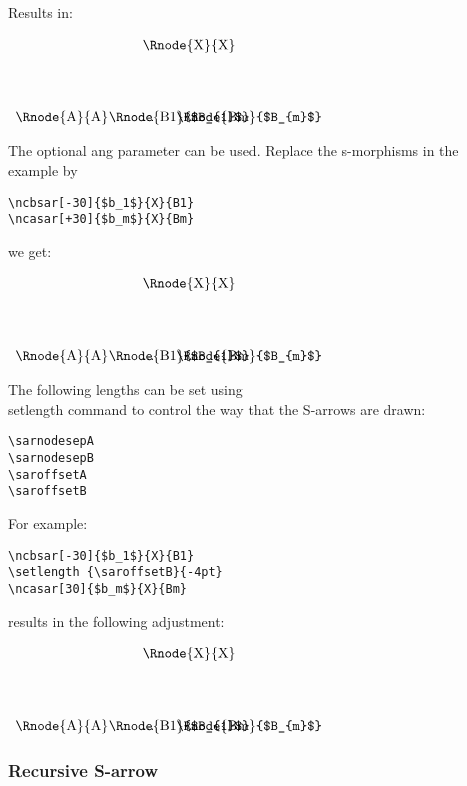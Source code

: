 \documentclass[10pt,a4paper]{article}
\begin{document}
\noindent Results in:
\begin{center}
$
\begin{array}{p{2cm}p{0.5cm}p{0.5cm}p{0.5cm}}
& & \Rnode{X}{X}& \\ [1.4cm]
\Rnode{A}{A} & \Rnode{B1}{$B_{1}$} & ... & \Rnode{Bm}{$B_{m}$}\\
\end{array}
$
\end{center}
\noindent The optional ang parameter can be used. Replace the s-morphisms in the example by
\begin{verbatim}
\ncbsar[-30]{$b_1$}{X}{B1}
\ncasar[+30]{$b_m$}{X}{Bm}
\end{verbatim}
we get:
\begin{center}
$
\begin{array}{p{2cm}p{0.5cm}p{0.5cm}p{0.5cm}}
& & \Rnode{X}{X}& \\ [1.4cm]
\Rnode{A}{A} & \Rnode{B1}{$B_{1}$} & ... & \Rnode{Bm}{$B_{m}$}\\
\end{array}
$
\end{center}
\noindent The following lengths can be set using \\setlength command to control the way that the S-arrows are drawn:
\begin{verbatim}
\sarnodesepA
\sarnodesepB
\saroffsetA
\saroffsetB
\end{verbatim}
For example:
\begin{verbatim}
\ncbsar[-30]{$b_1$}{X}{B1}
\setlength {\saroffsetB}{-4pt}
\ncasar[30]{$b_m$}{X}{Bm}
\end{verbatim}
\indent results in the following adjustment:
\begin{center}
$
\begin{array}{p{2cm}p{0.5cm}p{0.5cm}p{0.5cm}}
& & \Rnode{X}{X}& \\ [1.4cm]
\Rnode{A}{A} & \Rnode{B1}{$B_{1}$} & ... & \Rnode{Bm}{$B_{m}$}\\
\end{array}
$
\setlength {\saroffsetB}{-4pt}
\end{center}



\subsubsection {Recursive S-arrow}
\end{document}
